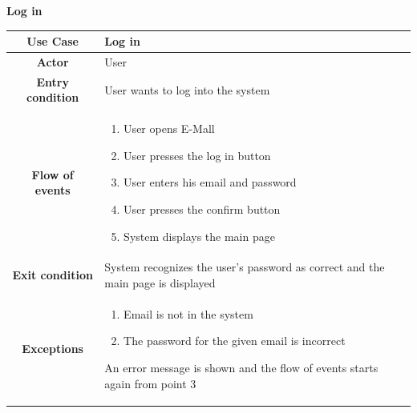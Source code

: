 \documentclass[table, 12pt]{article} %
\begin{document}
\begin{itemize}
             \begin{table}[H]
                \item[] \textbf{Log in}
                \item[]
                \centering
                \begin{tabular}{|c |m{}|}
                    \hline
                    \textbf{Use Case} & Log in\\ \hline
                    \textbf{Actor} & User\\ \hline
                    \textbf{Entry condition} & User wants to log into the system\\  \hline
                    \textbf{Flow of events} & \begin{enumerate}
                                                \item User opens E-Mall
                                                \item User presses the log in button
                                                \item User enters his email and password
                                                \item User presses the confirm button
                                                \item System displays the main page

                                            \end{enumerate}\\ \hline
                    \textbf{Exit condition} & System recognizes the user's password as correct and the main page is displayed  \\ \hline
                    \textbf{Exceptions} &  \begin{enumerate}
                        \item Email is not in the system
                        \item The password for the given email is incorrect

                    \end{enumerate}
                    An error message is shown and the flow of events starts again from point 3\\ \hline
                \end{tabular}
            \end{table}



\end{itemize}
\end{document}
